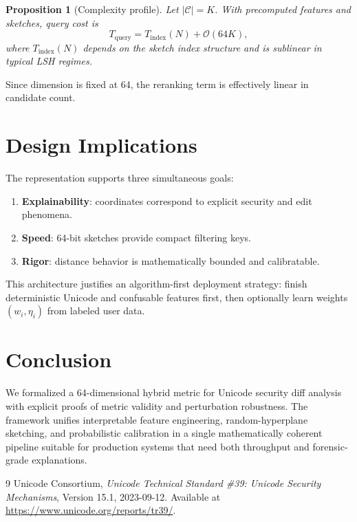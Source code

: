 \documentclass[11pt,a4paper]{article}
\newtheorem{proposition}{Proposition}
\begin{document}
\begin{proposition}[Complexity profile]
Let $|\mathcal{C}|=K$. With precomputed features and sketches, query cost is
\[
T_\text{query}=T_\text{index}(N)+\mathcal{O}(64K),
\]
where $T_\text{index}(N)$ depends on the sketch index structure and is sublinear in typical LSH regimes.
\end{proposition}

Since dimension is fixed at 64, the reranking term is effectively linear in candidate count.

\section{Design Implications}
The representation supports three simultaneous goals:
\begin{enumerate}
    \item \textbf{Explainability}: coordinates correspond to explicit security and edit phenomena.
    \item \textbf{Speed}: 64-bit sketches provide compact filtering keys.
    \item \textbf{Rigor}: distance behavior is mathematically bounded and calibratable.
\end{enumerate}

This architecture justifies an algorithm-first deployment strategy: finish deterministic Unicode and confusable features first, then optionally learn weights $(w_i,\eta_i)$ from labeled user data.

\section{Conclusion}
We formalized a 64-dimensional hybrid metric for Unicode security diff analysis with explicit proofs of metric validity and perturbation robustness. The framework unifies interpretable feature engineering, random-hyperplane sketching, and probabilistic calibration in a single mathematically coherent pipeline suitable for production systems that need both throughput and forensic-grade explanations.

\begin{thebibliography}{9}
Unicode Consortium, \emph{Unicode Technical Standard \#39: Unicode Security Mechanisms}, Version 15.1, 2023-09-12. Available at \url{https://www.unicode.org/reports/tr39/}.
\end{thebibliography}
\end{document}
